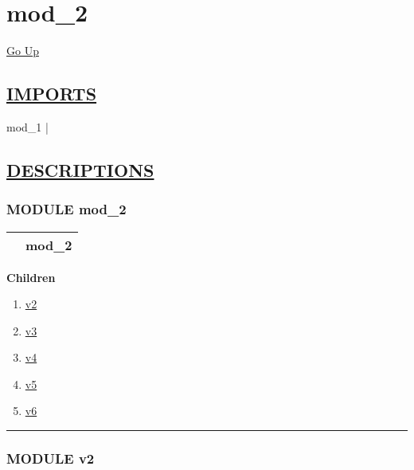 \chapter*{\color{headfile}
mod_2
}
\hypertarget{ecldoc:toc:mod_2}{}
\hyperlink{ecldoc:toc:root}{Go Up}

\section*{\underline{\textsf{IMPORTS}}}
\begin{doublespace}
{\large
mod\_1 |
}
\end{doublespace}

\section*{\underline{\textsf{DESCRIPTIONS}}}
\subsection*{\textsf{\colorbox{headtoc}{\color{white} MODULE}
mod\_2}}

\hypertarget{ecldoc:mod_2}{}

{\renewcommand{\arraystretch}{1.5}
\begin{tabularx}{\textwidth}{|>{\raggedright\arraybackslash}l|X|}
\hline
\hspace{0pt}\mytexttt{\color{red} } & \textbf{mod\_2} \\
\hline
\end{tabularx}
}

\par


\textbf{Children}
\begin{enumerate}
\item \hyperlink{ecldoc:mod_1}{v2}
\item \hyperlink{ecldoc:mod_2.v3}{v3}
\item \hyperlink{ecldoc:mod_2.v4}{v4}
\item \hyperlink{ecldoc:mod_2.v5}{v5}
\item \hyperlink{ecldoc:mod_2.v6}{v6}
\end{enumerate}

\rule{\linewidth}{0.5pt}

\subsection*{\textsf{\colorbox{headtoc}{\color{white} MODULE}
v2}}

